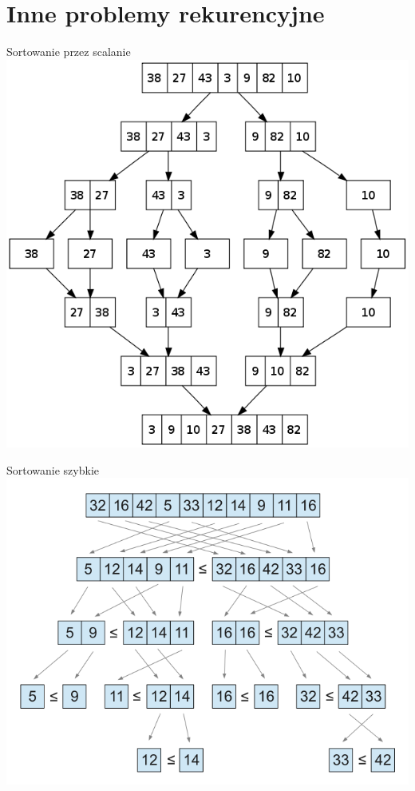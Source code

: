 \section{Inne problemy rekurencyjne}\label{sec:inneProblemyRekurencyjne}
\begin{frame}{Sortowanie przez scalanie}
    \includegraphics[width=\textwidth,height=0.8\textheight]{graphics/recursion/mergesort.png}
\end{frame}
\begin{frame}{Sortowanie szybkie}
    \includegraphics[width=\textwidth,height=0.8\textheight]{graphics/recursion/quicksort.png}
\end{frame}

